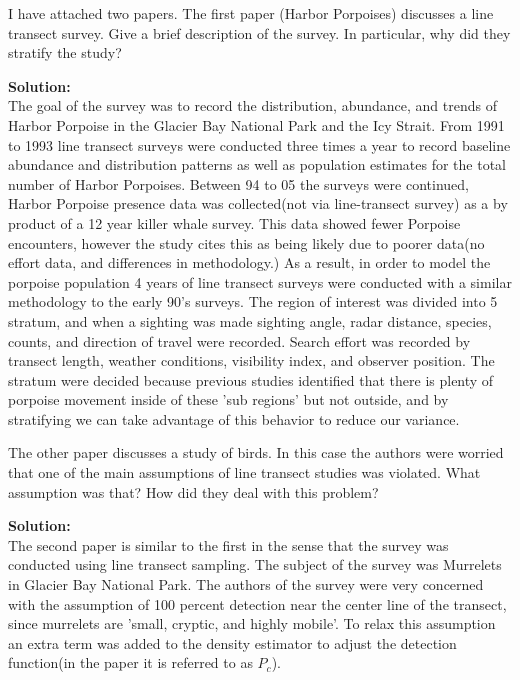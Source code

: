\documentclass[12pt]{article}
\makeatletter
\theoremstyle{homework}
\newenvironment{exercise}[1]
{\def\@currentlabel{#1}\exercisecore}
{\endexercisecore}
\newcommand{\localhead}[1]{\par\smallskip\noindent\textbf{#1}\nobreak\\}%
\newcommand\solution{\localhead{Solution:}}
\makeatother
\begin{document}
\begin{exercise}{4} I have attached two papers. The first paper (Harbor Porpoises) discusses a line 
  transect survey. Give a brief description of the survey. In particular, why did they stratify the study?\\
  \solution The goal of the survey was to record the distribution, abundance, and trends of Harbor Porpoise in the Glacier 
  Bay National Park and the Icy Strait. From 1991 to 1993 line transect surveys were conducted three times a year to record baseline abundance and distribution patterns as well as 
  population estimates for the total number of Harbor Porpoises. Between 94 to 05 the surveys were continued, Harbor Porpoise presence data was collected(not via line-transect survey) 
  as a by product of a 12 year killer whale survey. This data showed fewer Porpoise encounters, however the study cites this as being likely due to poorer data(no effort data, and differences in methodology.)
  As a result, in order to model the porpoise population 4 years of line transect surveys were conducted with a similar methodology to the early 90's surveys. 
  The region of interest was divided into 5 stratum, and when a sighting was made sighting angle, radar distance, species, counts, and direction of travel were recorded. Search effort was recorded by 
  transect length, weather conditions, visibility index, and observer position. The stratum were decided because previous studies identified that there is plenty of porpoise movement inside of these 'sub regions'
  but not outside, and by stratifying we can take advantage of this behavior to reduce our variance. 
  
\end{exercise}
\vspace{1in}


\begin{exercise}{5} The other paper discusses a study of birds. In this case the authors were worried that one of the main assumptions of line 
  transect studies was violated. What assumption was that? How did they deal with this problem?\\
  \solution The second paper is similar to the first in the sense that the survey was conducted using line transect sampling. The subject of the survey was 
  Murrelets in Glacier Bay National Park. The authors of the survey were very concerned with the assumption of 100 
  percent detection near the center line of the transect, since murrelets are 'small, cryptic, and highly mobile'. To relax this assumption an extra term was added to 
  the density estimator to adjust the detection function(in the paper it is referred to as $P_c$).

\end{exercise}
\vspace{1in}
\end{document}
